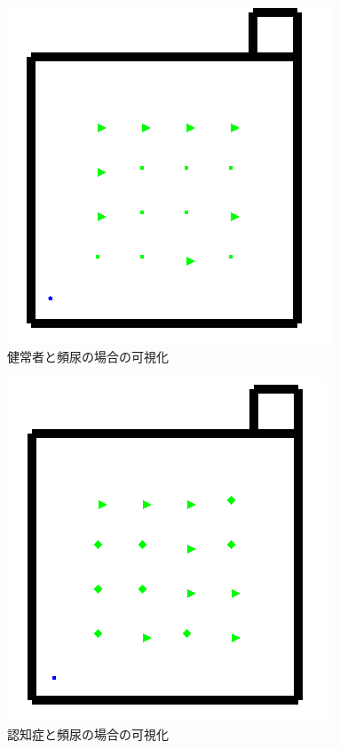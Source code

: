 \begin{figure}[htb]
\begin{center}
 \includegraphics[scale=0.6]{figures/health_frequently_urinate_v1.png}
 \caption[健常者と頻尿の場合の可視化]{健常者と頻尿の場合の可視化 \label{health_frequently_urinate_v1}}
\end{center}
\end{figure}

\begin{figure}[htb]
\begin{center}
 \includegraphics[scale=0.6]{figures/dementia_urinate_v1.png}
 \caption[認知症と頻尿の場合の可視化]{認知症と頻尿の場合の可視化 \label{dementia_urinate_v1}}
\end{center}
\end{figure}

